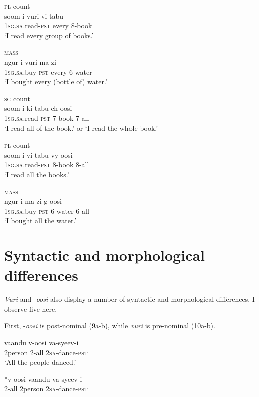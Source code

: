 \documentclass[output=paper]{langsci/langscibook}
\begin{document}
\ea
\textsc{pl} count\\
\gll soom-i      vuri    vi-tabu    \\
     1\textsc{sg.sa}.read-\textsc{pst}  every    8-book\\
\glt ‘I read every group of books.’
\z

\ea
\textsc{mass}\\
\gll ngur-i      vuri    ma-zi    \\
     1\textsc{sg.sa}.buy-\textsc{pst}    every    6-water\\
\glt ‘I bought every (bottle of) water.’
\z

\ea
\textsc{sg} count\\
\gll soom-i      ki-tabu  ch-oosi    \\
     1\textsc{sg.sa}.read-\textsc{pst}  7-book  7-all\\
\glt ‘I read all of the book.’ or ‘I read the whole book.’
\z

\ea
\textsc{pl} count\\
\gll soom-i      vi-tabu  vy-oosi  \\
     1\textsc{sg.sa}.read-\textsc{pst}  8-book  8-all\\
\glt ‘I read all the books.’
\z

\ea
\textsc{mass}\\
\gll ngur-i      ma-zi    g-oosi  \\
     1\textsc{sg.sa}.buy-\textsc{pst}    6-water  6-all\\
\glt ‘I bought all the water.’
\z

\section{Syntactic and morphological differences}

\textit{Vuri} and -\textit{oosi} also display a number of syntactic and morphological differences. I observe five here.

First, -\textit{oosi} is post-nominal (9a-b), while \textit{vuri} is pre-nominal (10a-b). 

\ea
\gll vaandu    v-oosi    va-syeev-i    \\
     2person    2-all    2\textsc{sa}-dance-\textsc{pst}       \\
\glt ‘All the people danced.’
\z

\ea
\gll \textup{*}v-oosi    vaandu  va-syeev-i  \\
     2-all    2person  2\textsc{sa}-dance-\textsc{pst}  \\
\z
\end{document}
